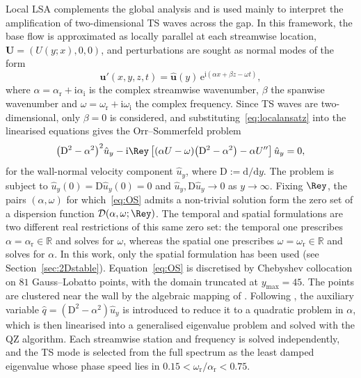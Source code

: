 \documentclass[lineno]{jfm}
\begin{document}
Local \ac{LSA} complements the global analysis and is used mainly to interpret the amplification of two-dimensional \ac{TS} waves across the gap. In this framework, the base flow is approximated as locally parallel at each streamwise location, $\boldsymbol{U}=(U(y;x),0,0)$, and perturbations are sought as normal modes of the form
\begin{equation}\label{eq:localansatz}
	\boldsymbol{u}'(x,y,z,t)
	=
	\hat{\boldsymbol{u}}(y)\,\mathrm{e}^{\mathrm{i}(\alpha x + \beta z - \omega t)},
\end{equation}
where $\alpha =\alpha_\mathrm{r}  + \mathrm{i}\alpha_\mathrm{i} $ is the complex streamwise wavenumber, $\beta $ the spanwise wavenumber and $\omega =\omega_\mathrm{r} +\mathrm{i}\omega_\mathrm{i} $ the complex frequency. Since \ac{TS} waves are two-dimensional, only $\beta=0$ is considered, and substituting~\eqref{eq:localansatz} into the linearised equations gives the Orr--Sommerfeld problem \citep{schmid2001stability}%
\begin{equation}\label{eq:OS}
	{\big({\mathrm{D}}^2-{\alpha}^2\big)}^2\hat{u}_y
	-\mathrm{i}\Rey\left[
		(\alpha U-\omega)\big({\mathrm{D}}^2-{\alpha}^2\big)
		-\alpha U''\right]\hat{u}_y=0,
\end{equation}
for the wall-normal velocity component $\hat{u}_y$, where $\mathrm{D}:=\mathrm{d}/\mathrm{d}y$. The problem is subject to $\hat{u}_y(0)=\mathrm{D}\hat{u}_y(0)=0$ and $\hat{u}_y,\mathrm{D}\hat{u}_y\to0$ as $y\to\infty$. Fixing $\Rey$, the pairs $(\alpha,\omega)$ for which~\eqref{eq:OS} admits a non-trivial solution form the zero set of a dispersion function $\mathcal{D}(\alpha,\omega;\Rey)$. The temporal and spatial formulations are two different real restrictions of this same zero set: the temporal one prescribes $\alpha=\alpha_\mathrm{r}\in\mathbb{R}$ and solves for $\omega$, whereas the spatial one prescribes $\omega=\omega_\mathrm{r}\in\mathbb{R}$ and solves for $\alpha$. In this work, only the spatial formulation has been used (see Section~\ref{sec:2Dstable}). Equation~\eqref{eq:OS} is discretised by Chebyshev collocation on $81$ Gauss--Lobatto points, with the domain truncated at $y_{\max}=45$. The points are clustered near the wall by the algebraic mapping of \citet{malik1990}. Following \citet{bridgesMorris1984}, the auxiliary variable $\hat{q}=({\mathrm{D}}^2-\alpha^2)\hat{u}_y$ is introduced to reduce it to a quadratic problem in $\alpha$, which is then linearised into a generalised eigenvalue problem and solved with the QZ algorithm. Each streamwise station and frequency is solved independently, and the \ac{TS} mode is selected from the full spectrum as the least damped eigenvalue whose phase speed lies in $0.15<\omega_\mathrm{r}/\alpha_\mathrm{r}<0.75$.
\end{document}
